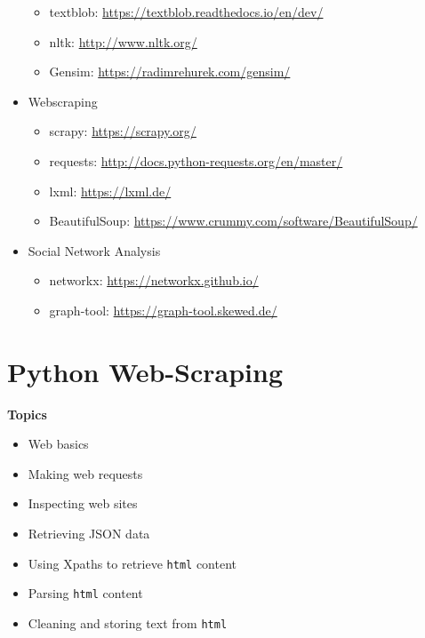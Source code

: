 \documentclass[
]{book}
\providecommand{\tightlist}{%
  \setlength{\itemsep}{0pt}\setlength{\parskip}{0pt}}
\begin{document}
\begin{itemize}
  \begin{itemize}
  \tightlist
  \item
    textblob: \url{https://textblob.readthedocs.io/en/dev/}
  \item
    nltk: \url{http://www.nltk.org/}
  \item
    Gensim: \url{https://radimrehurek.com/gensim/}
  \end{itemize}
\item
  Webscraping

  \begin{itemize}
  \tightlist
  \item
    scrapy: \url{https://scrapy.org/}
  \item
    requests: \url{http://docs.python-requests.org/en/master/}
  \item
    lxml: \url{https://lxml.de/}
  \item
    BeautifulSoup: \url{https://www.crummy.com/software/BeautifulSoup/}
  \end{itemize}
\item
  Social Network Analysis

  \begin{itemize}
  \tightlist
  \item
    networkx: \url{https://networkx.github.io/}
  \item
    graph-tool: \url{https://graph-tool.skewed.de/}
  \end{itemize}
\end{itemize}

\hypertarget{python-web-scraping}{%
\chapter{Python Web-Scraping}\label{python-web-scraping}}

\textbf{Topics}

\begin{itemize}
\tightlist
\item
  Web basics
\item
  Making web requests
\item
  Inspecting web sites
\item
  Retrieving JSON data
\item
  Using Xpaths to retrieve \texttt{html} content
\item
  Parsing \texttt{html} content
\item
  Cleaning and storing text from \texttt{html}
\end{itemize}
\end{document}
